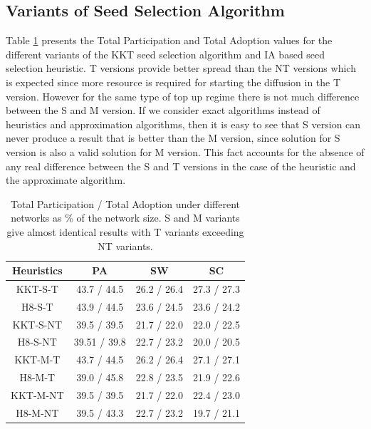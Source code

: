 \documentclass[letterpaper]{article}
\theoremstyle{plain} 		\newtheorem{thm}{Theorem}[section]
\theoremstyle{definition} 	\newtheorem{defn}[thm]{Definition}
\theoremstyle{remark}		\newtheorem{rem}{Remark}
\begin{document}
\subsection{Variants of Seed Selection Algorithm} \label{sec:t-nt-comp}
Table \ref{tab:t-nt-comp} presents the Total Participation and Total Adoption values for the different variants of the KKT seed selection algorithm and IA based seed selection heuristic. T versions provide better spread than the NT versions which is expected since more resource is required for starting the diffusion in the T version. However for the same type of top up regime there is not much difference between the S and M version. If we consider exact algorithms instead of heuristics and approximation algorithms, then it is easy to see that S version can never produce a result that is better than the M version, since solution for S version is also a valid solution for M version. This fact accounts for the absence of any real difference between the S and T versions in the case of the heuristic and the approximate algorithm. 
\begin{table}[htb]\footnotesize
    \centering
    \caption{Total Participation / Total Adoption under different networks as \% of the network size. S and M variants give almost identical results with T variants exceeding NT variants.}\label{tab:t-nt-comp}
    \begin{tabular}{cccc} \toprule
        Heuristics & PA & SW & SC \\ \midrule
        KKT-S-T & 43.7 / 44.5 & 26.2 / 26.4 & 27.3 / 27.3  \\
        H8-S-T & 43.9 / 44.5 & 23.6 / 24.5 & 23.6 / 24.2 \\ 
        \midrule
        KKT-S-NT & 39.5 / 39.5 & 21.7 / 22.0 & 22.0 / 22.5  \\
        H8-S-NT & 39.51 / 39.8 & 22.7 / 23.2 & 20.0 / 20.5 \\ 
        \midrule
        KKT-M-T & 43.7 / 44.5 & 26.2 / 26.4 & 27.1 / 27.1  \\
        H8-M-T & 39.0 / 45.8 & 22.8 / 23.5 & 21.9 / 22.6 \\ 
        \midrule
        KKT-M-NT & 39.5 / 39.5 & 21.7 / 22.0 & 22.4 / 23.0  \\
        H8-M-NT & 39.5 / 43.3 & 22.7 / 23.2 & 19.7 / 21.1 \\ 
        \bottomrule
        
    \end{tabular}
\end{table}



\end{document}

